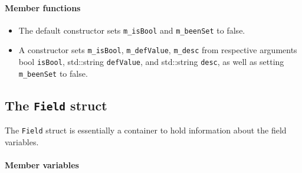 \paragraph{Member functions}

\begin{itemize}

\item The default constructor sets \verb+m_isBool+ and \verb+m_beenSet+ to false.

\item A constructor sets \verb+m_isBool+, \verb+m_defValue+, \verb+m_desc+ from respective arguments bool \verb+isBool+, std::string \verb+defValue+, and std::string \verb+desc+, as well as setting \verb+m_beenSet+ to false.

\end{itemize}

\subsection{The \texttt{Field} struct}

The \verb+Field+ struct is essentially a container to hold information about the field variables.

\paragraph{Member variables}

